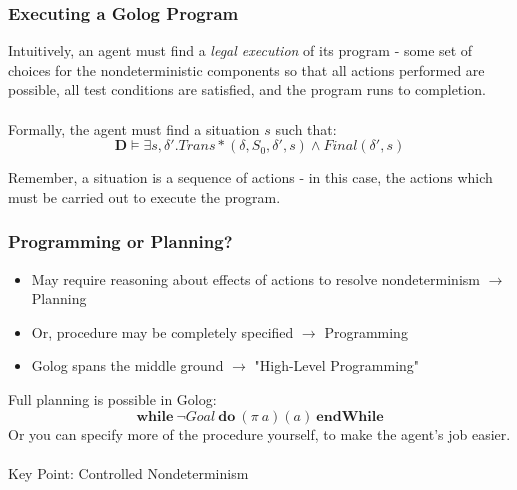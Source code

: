 \documentclass{beamer}
\begin{document}
\begin{frame}
\frametitle{Executing a Golog Program}
Intuitively, an agent must find a \emph{legal execution} of its program - some set of choices for the nondeterministic components so that all
actions performed are possible, all test conditions are satisfied, and the
program runs to completion.\\
\ \\
Formally, the agent must find a situation $s$ such that:\[
\mathbf{D} \models \exists s,\delta' . Trans*(\delta,S_0,\delta',s) \wedge Final(\delta',s)\]

Remember, a situation is a sequence of actions - in this case, the actions which must be carried out to execute the program.
\end{frame}

\begin{frame}
\frametitle{Programming or Planning?}
\begin{itemize}
  \item May require reasoning about effects of actions to resolve nondeterminism
$\rightarrow$ Planning
  \item Or, procedure may be completely specified $\rightarrow$ Programming
  \item Golog spans the middle ground $\rightarrow$ "High-Level Programming"
\end{itemize}
\pause
Full planning is possible in Golog:\[
\mathbf{while}\ \neg Goal\ \mathbf{do}\ (\pi\ a)(a)\ \mathbf{endWhile}\]
\pause
Or you can specify more of the procedure yourself, to make the agent's job
easier.\\
\ \\
Key Point: \alert{Controlled} Nondeterminism
\end{frame}
\end{document}
